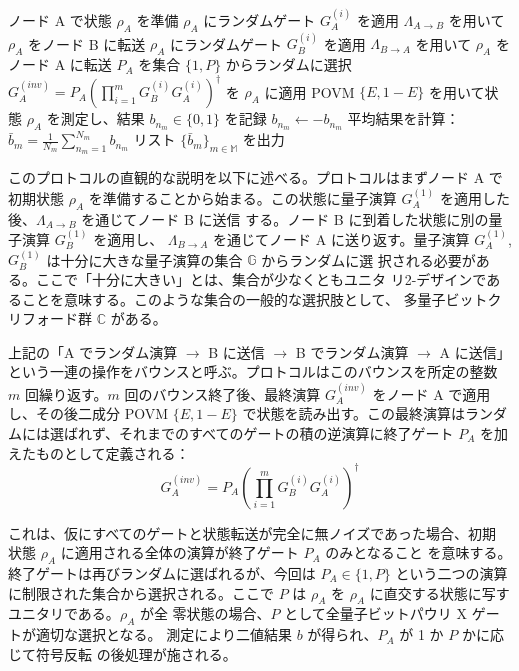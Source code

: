\documentclass[conference]{IEEEtran}
\begin{document}
\begin{algorithm}[H]
\caption{二節点ネットワークベンチマーキングプロトコル}
\begin{algorithmic}[1]
        \State ノード A で状態 $\rho_A$ を準備
            \State $\rho_A$ にランダムゲート $G_A^{(i)}$ を適用
            \State $\Lambda_{A \to B}$ を用いて $\rho_A$ をノード B に転送
            \State $\rho_A$ にランダムゲート $G_B^{(i)}$ を適用
            \State $\Lambda_{B \to A}$ を用いて $\rho_A$ をノード A に転送
        \EndFor
        \State $P_A$ を集合 $\{1, P\}$ からランダムに選択
        \State $G_A^{(inv)} = P_A \left( \prod_{i=1}^{m} G_B^{(i)} G_A^{(i)} \right)^\dagger$ を $\rho_A$ に適用
        \State POVM $\{E, 1-E\}$ を用いて状態 $\rho_A$ を測定し、結果 $b_{n_m} \in \{0, 1\}$ を記録
            \State $b_{n_m} \gets -b_{n_m}$
        \EndIf
    \EndFor
    \State 平均結果を計算：$\bar{b}_m = \frac{1}{N_m} \sum_{n_m=1}^{N_m} b_{n_m}$
\EndFor
\State リスト $\{\bar{b}_m\}_{m \in \mathbb{M}}$ を出力
\end{algorithmic}
\end{algorithm}

このプロトコルの直観的な説明を以下に述べる。プロトコルはまずノード A
で初期状態 \(\rho_A\) を準備することから始まる。この状態に量子演算
\(G_A^{(1)}\) を適用した後、\(\Lambda_{A \to B}\) を通じてノード B に送信
する。ノード B に到着した状態に別の量子演算 \(G_B^{(1)}\) を適用し、
\(\Lambda_{B \to A}\) を通じてノード A に送り返す。量子演算 \(G_A^{(1)}\),
\(G_B^{(1)}\) は十分に大きな量子演算の集合 \(\mathbb{G}\) からランダムに選
択される必要がある。ここで「十分に大きい」とは、集合が少なくともユニタ
リ2-デザインであることを意味する。このような集合の一般的な選択肢として、
多量子ビットクリフォード群 \(\mathbb{C}\) がある。

上記の「A でランダム演算 \(\to\) B に送信 \(\to\) B でランダム演算 \(\to\) A に送信」という一連の操作をバウンスと呼ぶ。プロトコルはこのバウンスを所定の整数 \(m\) 回繰り返す。\(m\) 回のバウンス終了後、最終演算 \(G_A^{(inv)}\) をノード A で適用し、その後二成分 POVM \(\{E, 1-E\}\) で状態を読み出す。この最終演算はランダムには選ばれず、それまでのすべてのゲートの積の逆演算に終了ゲート \(P_A\) を加えたものとして定義される：
\begin{equation}
G_A^{(inv)} = P_A \left( \prod_{i=1}^{m} G_B^{(i)} G_A^{(i)} \right)^\dagger
\end{equation}

これは、仮にすべてのゲートと状態転送が完全に無ノイズであった場合、初期
状態 \(\rho_A\) に適用される全体の演算が終了ゲート \(P_A\) のみとなること
を意味する。終了ゲートは再びランダムに選ばれるが、今回は \(P_A \in \{1,
P\}\) という二つの演算に制限された集合から選択される。ここで \(P\) は
\(\rho_A\) を \(\rho_A\) に直交する状態に写すユニタリである。\(\rho_A\) が全
零状態の場合、\(P\) として全量子ビットパウリ X ゲートが適切な選択となる。
測定により二値結果 \(b\) が得られ、\(P_A\) が 1 か \(P\) かに応じて符号反転
の後処理が施される。
\end{document}

